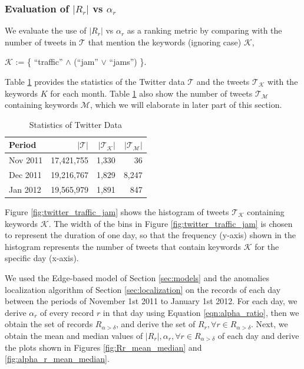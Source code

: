 \documentclass[conference]{IEEEtran.1.8}
\begin{document}
\subsubsection{Evaluation of $|R_r|$ vs $\alpha_r$}

We evaluate the use of $|R_r|$ vs $\alpha_r$ as a ranking metric by comparing with the number of tweets in $\mathcal{T}$ that mention the keywords (ignoring case) $\mathcal{K}$, 
\begin{center}
	$\mathcal{K}$ := \{ ``traffic'' $\land$ (``jam'' $\lor$ ``jams'') \}.
\end{center}
Table \ref{tbl:twitter} provides the statistics of the Twitter data $\mathcal{T}$ and the tweets $\mathcal{T}_{\mathcal{K}}$ with the keywords $K$ for each month. Table \ref{tbl:twitter} also show the number of tweets $\mathcal{T}_{\mathcal{M}}$ containing keywords $\mathcal{M}$, which we will elaborate in later part of this section.
\begin{table}[htb]
	\centering
	\caption{Statistics of Twitter Data}
	\label{tbl:twitter}
	\begin{tabular}{|l|r|r|r|}
		\hline
			Period & $| \mathcal{T} |$ & $| \mathcal{T}_{\mathcal{K}} |$ & $| \mathcal{T}_{\mathcal{M}} |$ \\
		\hline
			Nov 2011 & 17,421,755 & 1,330 & 36 \\
		\hline
			Dec 2011 & 19,216,767 & 1,829 & 8,247 \\
		\hline
			Jan 2012 &  19,565,979 & 1,891 & 847 \\
		\hline
	\end{tabular}	
\end{table}

Figure \ref{fig:twitter_traffic_jam} shows the histogram of tweets $\mathcal{T}_{\mathcal{K}}$ containing keywords $\mathcal{K}$. The width of the bins in Figure \ref{fig:twitter_traffic_jam} is chosen to represent the duration of one day, so that the frequency (y-axis) shown in the histogram represents the number of tweets that contain keywords $\mathcal{K}$ for the specific day (x-axis).

We used the Edge-based model of Section \ref{sec:models} and the anomalies localization algorithm of Section \ref{sec:localization} on the records of each day between the periods of November 1st 2011 to January 1st 2012. For each day, we derive $\alpha_r$ of every record $r$ in that day using Equation \ref{eqn:alpha_ratio}, then we obtain the set of records $R_{\alpha > \delta}$, and derive the set of $R_r, \forall r \in R_{\alpha > \delta}$. Next, we obtain the mean and median values of $|R_r|, \alpha_r, \forall r \in R_{\alpha > \delta}$ of each day and derive the plots shown in Figures \ref{fig:Rr_mean_median} and \ref{fig:alpha_r_mean_median}. 
\end{document}
